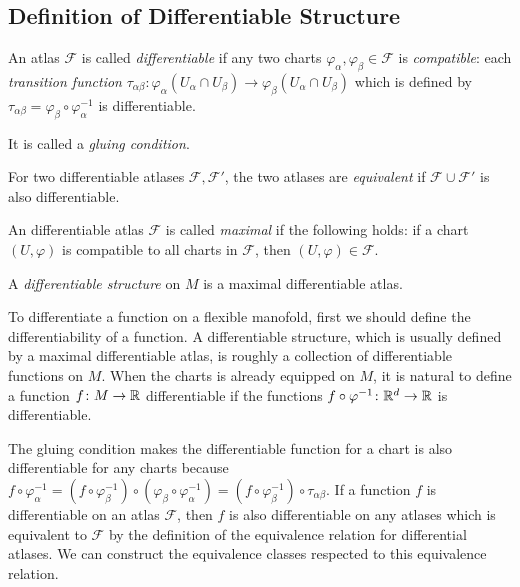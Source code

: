 \documentclass{../crs}
\begin{document}
\subsection{Definition of Differentiable Structure}


\begin{defn}
An atlas $\mathcal{F}$ is called \emph{differentiable} if any two charts $\varphi_\alpha,\varphi_\beta\in\mathcal{F}$ is \emph{compatible}: each \emph{transition function} $\tau_{\alpha\beta}\colon\varphi_\alpha(U_\alpha\cap U_\beta)\to\varphi_\beta(U_\alpha\cap U_\beta)$ which is defined by $\tau_{\alpha\beta}=\varphi_\beta\circ\varphi_\alpha^{-1}$ is differentiable.
\end{defn}
It is called a \emph{gluing condition}.

\begin{defn}
For two differentiable atlases $\mathcal{F},\mathcal{F}'$, the two atlases are \emph{equivalent} if $\mathcal{F}\cup\mathcal{F}'$ is also differentiable.
\end{defn}

\begin{defn}
An differentiable atlas $\mathcal{F}$ is called \emph{maximal} if the following holds:
if a chart $(U,\varphi)$ is compatible to all charts in $\mathcal{F}$, then $(U,\varphi)\in\mathcal{F}$.
\end{defn}

\begin{defn}
A \emph{differentiable structure} on $M$ is a maximal differentiable atlas.
\end{defn}

To differentiate a function on a flexible manofold, first we should define the differentiability of a function.
A differentiable structure, which is usually defined by a maximal differentiable atlas, is roughly a collection of differentiable functions on $M$.
When the charts is already equipped on $M$, it is natural to define a function $f\colon M\to\Bbb{R}$ differentiable if the functions $f\circ\varphi^{-1}\colon\Bbb{R}^d\to\Bbb{R}$ is differentiable.

The gluing condition makes the differentiable function for a chart is also differentiable for any charts because $f\circ\varphi_\alpha^{-1}=(f\circ\varphi_\beta^{-1})\circ(\varphi_\beta\circ\varphi_\alpha^{-1})
=(f\circ\varphi_\beta^{-1})\circ\tau_{\alpha\beta}$.
If a function $f$ is differentiable on an atlas $\mathcal{F}$, then $f$ is also differentiable on any atlases which is equivalent to $\mathcal{F}$ by the definition of the equivalence relation for differential atlases.
We can construct the equivalence classes respected to this equivalence relation.
\end{document}
